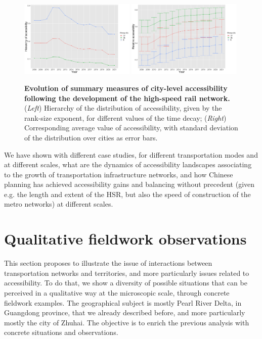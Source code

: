 \begin{figure}
	\includegraphics[width=0.49\textwidth]{figures/access_hierarchy.png}
	\includegraphics[width=0.49\textwidth]{figures/access_summary.png}
	\caption{\textbf{Evolution of summary measures of city-level accessibility following the development of the high-speed rail network.} (\textit{Left}) Hierarchy of the distribution of accessibility, given by the rank-size exponent, for different values of the time decay; (\textit{Right}) Corresponding average value of accessibility, with standard deviation of the distribution over cities as error bars.\label{fig:hsraccess}}
\end{figure}

We have shown with different case studies, for different transportation modes and at different scales, what are the dynamics of accessibility landscapes associating to the growth of transportation infrastructure networks, and how Chinese planning has achieved accessibility gains and balancing without precedent (given e.g. the length and extent of the HSR, but also the speed of construction of the metro networks) at different scales.


\section{Qualitative fieldwork observations}


This section proposes to illustrate the issue of interactions between transportation networks and territories, and more particularly issues related to accessibility. To do that, we show a diversity of possible situations that can be perceived in a qualitative way at the microscopic scale, through concrete fieldwork examples. The geographical subject is mostly Pearl River Delta, in Guangdong province, that we already described before, and more particularly mostly the city of Zhuhai. The objective is to enrich the previous analysis with concrete situations and observations.


